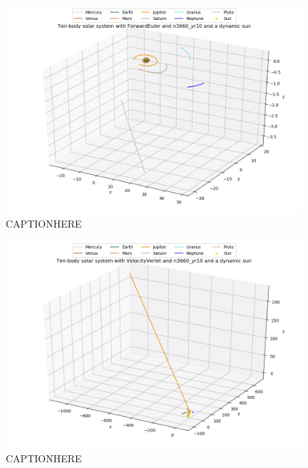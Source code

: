 \documentclass{article}
\begin{document}
    \begin{figure}[H]
        \centering
        \includegraphics[width = 11cm]{img/plot3D_10body_F_n3660_yr10_dynamic_sun.png}
        \caption{CAPTIONHERE}
        \label{fig:plot3D_10body_F_n3660_yr10_dynamic_sun}
    \end{figure}

    \begin{figure}[H]
        \centering
        \includegraphics[width = 11cm]{img/plot3D_10body_V_n3660_yr10_dynamic_sun.png}
        \caption{CAPTIONHERE}
        \label{fig:plot3D_10body_V_n3660_yr10_dynamic_sun}
    \end{figure}

\end{document}
